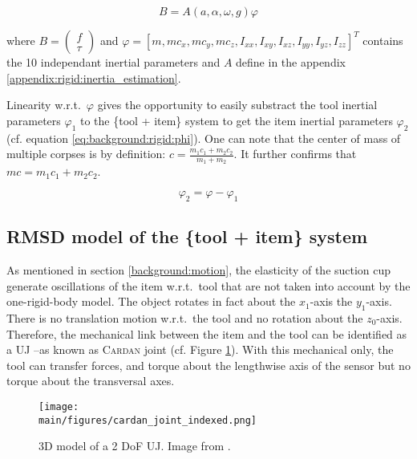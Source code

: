 \documentclass[/home/francois/latex/report/main.tex]{subfiles}
\begin{document}
\begin{equation}
  \label{background:eq:inertia_estimation}
B = A(a, \alpha, \omega, g) \varphi
\end{equation}

where $B =  \begin{pmatrix} f \\ \tau \end{pmatrix}$ and $\varphi = [m, m c_x, m c_y, m c_z, I_{xx}, I_{xy}, I_{xz}, I_{yy}, I_{yz}, I_{zz}]^T$ contains the 10 independant inertial parameters and $A$ define in the appendix \ref{appendix:rigid:inertia_estimation}.

Linearity w.r.t.\ $\varphi$ gives the opportunity to easily substract the tool inertial parameters $\varphi_1$ to the \{tool + item\} system to get the item inertial parameters $\varphi_2$ (cf. equation \ref{eq:background:rigid:phi}). One can note that the center of mass of multiple corpses is by definition: $c = \frac{m_1 c_1 + m_2 c_2}{m_1 + m_2}$. It further confirms that $mc = m_1 c_1 + m_2 c_2$.

\begin{equation}
  \label{eq:background:rigid:phi}
  \varphi_2 = \varphi - \varphi_{1}
\end{equation}


\subsection{\ac{RMSD} model of the \{tool + item\} system}

As mentioned in section \ref{background:motion}, the elasticity of the suction cup generate oscillations of the item w.r.t.\ tool that are not taken into account by the one-rigid-body model. The object rotates in fact about the $x_1$-axis the $y_1$-axis. There is no translation motion w.r.t.\ the tool and no rotation about the $z_0$-axis. Therefore, the mechanical link between the item and the tool can be identified as a \ac{UJ} –as known as \textsc{Cardan} joint (cf. Figure \ref{fig:background:cardan}). With this mechanical only, the tool can transfer forces, and torque about the lengthwise axis of the sensor but no torque about the transversal axes.

\begin{figure}
  \centering
  \texttt{[image: \\main/figures/cardan\_joint\_indexed.png]}
  \caption{3D model of a 2 \ac{DoF} \ac{UJ}. Image from \cite{3dexport2020}.}
  \label{fig:background:cardan}
\end{figure}
\end{document}
